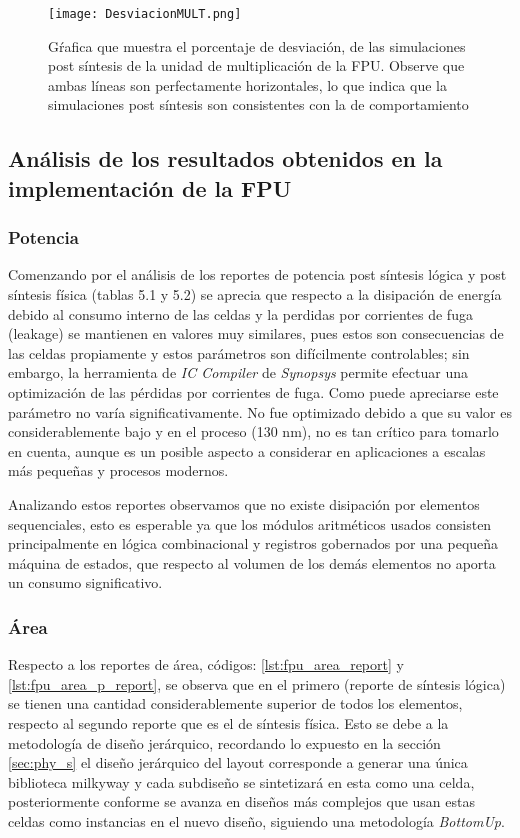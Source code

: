 \begin{figure}[h]
\texttt{[image: DesviacionMULT.png]}
\centering
\caption{Gŕafica que muestra el porcentaje de desviación, de las simulaciones post síntesis de la unidad de multiplicación de la FPU. Observe que ambas líneas son perfectamente horizontales, lo que indica que la simulaciones post síntesis son consistentes con la de comportamiento}
\label{fig:desv_mult}
\end{figure}

\newpage

\subsection{Análisis de los resultados obtenidos en la implementación de la FPU}

\subsubsection{Potencia}
Comenzando por el análisis de los reportes de potencia post síntesis lógica y post síntesis física (tablas 5.1 y 5.2) se aprecia que respecto a la disipación de energía debido al consumo interno de las celdas y la perdidas por corrientes de fuga (leakage) se mantienen en valores muy similares, pues estos son consecuencias de las celdas propiamente y estos parámetros son difícilmente controlables; sin embargo, la herramienta de \textit{IC Compiler} de \textit{Synopsys} permite efectuar una optimización de las pérdidas por corrientes de fuga. Como puede apreciarse este parámetro no varía significativamente. No fue optimizado debido a que su valor es considerablemente bajo y en el proceso (130 nm), no es tan crítico para tomarlo en cuenta, aunque es un posible aspecto a considerar en aplicaciones a escalas más pequeñas y procesos modernos.

Analizando estos reportes observamos que no existe disipación por elementos sequenciales, esto es esperable ya que los módulos aritméticos usados consisten principalmente en lógica combinacional y registros gobernados por una pequeña máquina de estados, que respecto al volumen de los demás elementos no aporta un consumo significativo.

\subsubsection{Área}
Respecto a los reportes de área, códigos: \ref{lst:fpu_area_report} y \ref{lst:fpu_area_p_report}, se observa que en el primero (reporte de síntesis lógica) se tienen una cantidad considerablemente superior de todos los elementos, respecto al segundo reporte que es el de síntesis física. Esto se debe a la metodología de diseño jerárquico, recordando lo expuesto en la sección \ref{sec:phy_s} el diseño jerárquico del layout corresponde a generar una única biblioteca milkyway y cada subdiseño se sintetizará en esta como una celda, posteriormente conforme se avanza en diseños más complejos que usan estas celdas como instancias en el nuevo diseño, siguiendo una metodología \textit{BottomUp}.

